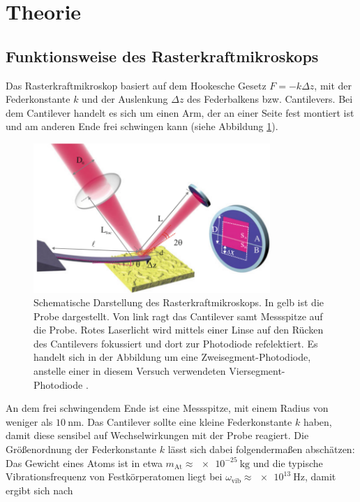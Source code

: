 \section{Theorie}
\label{sec:Theorie}

\subsection{Funktionsweise des Rasterkraftmikroskops}
\label{sec:Rasterkraftmikroskop}

Das Rasterkraftmikroskop basiert auf dem Hookesche Gesetz $F= -k\Delta z$, mit
der Federkonstante $k$ und der Auslenkung $\Delta z$ des Federbalkens bzw. Cantilevers.
Bei dem Cantilever handelt es sich um einen Arm, der an einer Seite fest montiert
ist und am anderen Ende frei schwingen kann (siehe Abbildung \ref{fig:AFM}).

\begin{figure}[H]
	\centering
	\includegraphics[width=0.8\textwidth]{Abb/AFM.png}
	\caption{Schematische Darstellung des Rasterkraftmikroskops. In gelb ist die
  Probe dargestellt. Von link ragt das Cantilever samt Messspitze auf die Probe.
  Rotes Laserlicht wird mittels einer Linse auf den Rücken des Cantilevers
  fokussiert und dort zur Photodiode refelektiert. Es handelt sich in der Abbildung
  um eine Zweisegment-Photodiode, anstelle einer in diesem Versuch verwendeten
  Viersegment-Photodiode \cite[161]{AFM}.}
	\label{fig:AFM}
\end{figure}

\noindent
An dem frei schwingendem Ende ist eine Messspitze, mit einem Radius von weniger
als $\SI{10}{\nano\meter}$. Das Cantilever sollte eine kleine Federkonstante $k$ haben,
damit diese sensibel auf Wechselwirkungen mit der Probe reagiert. Die Größenordnung
der Federkonstante $k$ lässt sich dabei folgendermaßen abschätzen: Das Gewicht
eines Atoms ist in etwa $m_{\text{At}} \approx \SI{e-25}{\kilo\gram}$ und
die typische Vibrationsfrequenz von Festkörperatomen liegt bei $\omega_{\text{vib}}
\approx\SI{e13}{\hertz}$, damit ergibt sich nach

